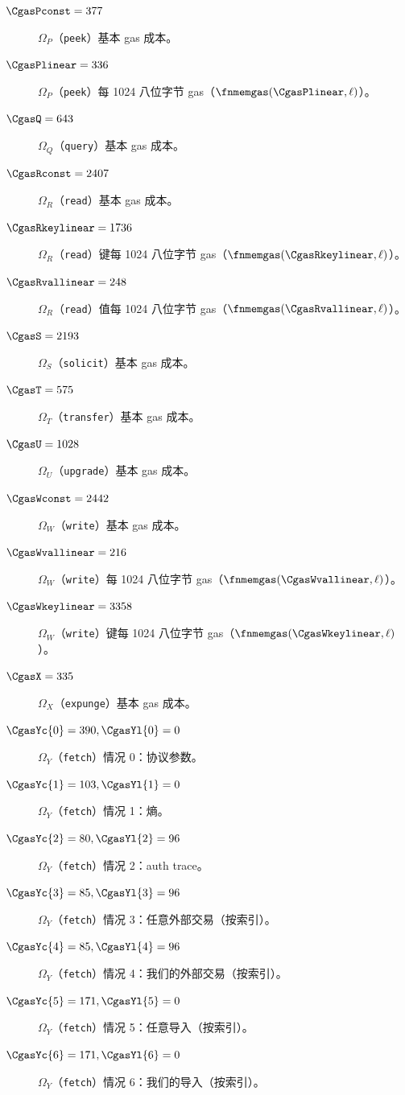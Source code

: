 \begin{description}
  \item[$\CgasPconst = 377$] $\Omega_P$（\texttt{peek}）基本 gas 成本。
  \item[$\CgasPlinear = 336$] $\Omega_P$（\texttt{peek}）每 1024 八位字节 gas（$\fnmemgas(\CgasPlinear, \ell)$）。
  \item[$\CgasQ = 643$] $\Omega_Q$（\texttt{query}）基本 gas 成本。
  \item[$\CgasRconst = 2407$] $\Omega_R$（\texttt{read}）基本 gas 成本。
  \item[$\CgasRkeylinear = 1736$] $\Omega_R$（\texttt{read}）键每 1024 八位字节 gas（$\fnmemgas(\CgasRkeylinear, \ell)$）。
  \item[$\CgasRvallinear = 248$] $\Omega_R$（\texttt{read}）值每 1024 八位字节 gas（$\fnmemgas(\CgasRvallinear, \ell)$）。
  \item[$\CgasS = 2193$] $\Omega_S$（\texttt{solicit}）基本 gas 成本。
  \item[$\CgasT = 575$] $\Omega_T$（\texttt{transfer}）基本 gas 成本。
  \item[$\CgasU = 1028$] $\Omega_U$（\texttt{upgrade}）基本 gas 成本。
  \item[$\CgasWconst = 2442$] $\Omega_W$（\texttt{write}）基本 gas 成本。
  \item[$\CgasWvallinear = 216$] $\Omega_W$（\texttt{write}）每 1024 八位字节 gas（$\fnmemgas(\CgasWvallinear, \ell)$）。
  \item[$\CgasWkeylinear = 3358$] $\Omega_W$（\texttt{write}）键每 1024 八位字节 gas（$\fnmemgas(\CgasWkeylinear, \ell)$）。
  \item[$\CgasX = 335$] $\Omega_X$（\texttt{expunge}）基本 gas 成本。
  \item[$\CgasYc{0} = 390, \CgasYl{0} = 0$] $\Omega_Y$（\texttt{fetch}）情况 0：协议参数。
  \item[$\CgasYc{1} = 103, \CgasYl{1} = 0$] $\Omega_Y$（\texttt{fetch}）情况 1：熵。
  \item[$\CgasYc{2} = 80, \CgasYl{2} = 96$] $\Omega_Y$（\texttt{fetch}）情况 2：auth trace。
  \item[$\CgasYc{3} = 85, \CgasYl{3} = 96$] $\Omega_Y$（\texttt{fetch}）情况 3：任意外部交易（按索引）。
  \item[$\CgasYc{4} = 85, \CgasYl{4} = 96$] $\Omega_Y$（\texttt{fetch}）情况 4：我们的外部交易（按索引）。
  \item[$\CgasYc{5} = 171, \CgasYl{5} = 0$] $\Omega_Y$（\texttt{fetch}）情况 5：任意导入（按索引）。
  \item[$\CgasYc{6} = 171, \CgasYl{6} = 0$] $\Omega_Y$（\texttt{fetch}）情况 6：我们的导入（按索引）。

\end{description}
